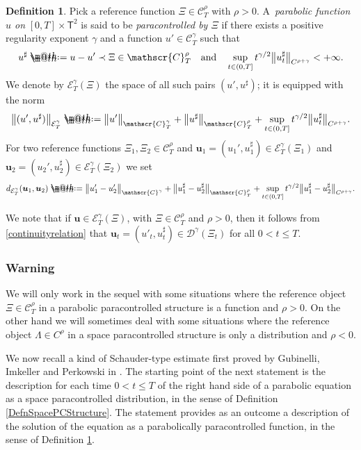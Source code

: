 \documentclass[JEP,XML,SOM,Unicode,published]{cedram}
\makeatletter
\theoremstyle{definition}
\newtheorem{defn}[thm]{Definition}
\newcommand{\bsfT}{\mathbf{\mathsf{T}}}
\newcommand{\mcD}{\mathcal{D}}
\newcommand{\mcE}{\mathcal{E}}
\newcommand{\bsu}{\boldsymbol{u}}
\newcommand{\scrC}{\ensuremath{\mathscr{C}}}
\newcommand*{\defeq}{\mathrel{\rlap{%
\raisebox{0.3ex}{$\m@th\cdot$}}%
\raisebox{-0.3ex}{$\m@th\cdot$}}%
=}
\makeatother
\begin{document}
\begin{defn} \label{DefnParabolicPCStructure}
Pick a reference function $\Xi\in\scrC_T^\rho$ with $\rho>0$. A~\emph{parabolic function $u$ on} \emph{$[0,T]\times\bsfT^2$} is said to be \emph{paracontrolled by $\Xi$} if there exists a positive regularity exponent $\gamma$ and a function $u'\in\scrC^\gamma_T$ such that\vspace*{-3pt}
\[
u^\sharp \defeq u-u'\prec \Xi \in \scrC_T^\rho
\quad
\text{and}
\quad
\sup_{t\in(0,T]}t^{\gamma/2}\big\Vert u^\sharp_t\big\Vert_{C^{\rho+\gamma}} < +\infty.
\]
We denote by $\mcE_T^{\gamma}(\Xi)$ the space of all such pairs $(u',u^\sharp)$; it is equipped with the norm\vspace*{-3pt}
\[
\big\Vert(u',u^\sharp)\big\Vert_{\mcE^{\gamma}_T} \defeq \big\Vert u'\big\Vert_{\scrC_T^\gamma} + \big\Vert u^\sharp\big\Vert_{\scrC_T^\rho} + \sup_{t\in(0,T]}t^{\gamma/2}\big\Vert u^\sharp_t\big\Vert_{C^{\rho+\gamma}}.
\]
For two reference functions $\Xi_1, \Xi_2\in\scrC^\rho_T$ and $\bsu_1=(u_1',u_1^\sharp)\in\mcE^{\gamma}_T(\Xi_1)$ and $\bsu_2 =(u_2',u_2^\sharp)\in\mcE^{\gamma}_T(\Xi_2)$ we set
\[
d_{\mcE^{\gamma}_T}(\bsu_1,\bsu_2) \defeq \big\Vert u_1'-u_2'\big\Vert_{\scrC^\gamma} + \big\Vert u_1^\sharp-u_2^\sharp \big\Vert_{\scrC^\rho_T} + \sup_{t\in(0,T]}t^{\gamma/2}\big\Vert u_1^\sharp-u_2^\sharp\big\Vert_{C^{\rho+\gamma}}.
\]
\end{defn}

We note that if $\bsu\in\mcE^\gamma_T(\Xi)$, with $\Xi\in\scrC^\rho_T$ and $\rho>0$, then it follows from \eqref{continuityrelation} that $\bsu_t=(u'_t,u^\sharp_t) \in \mcD^\gamma(\Xi_t)$ for all $0<t\leq T$.

\subsubsection*{Warning}
We will only work in the sequel with some situations where the reference object $\Xi\in\scrC_T^\rho$ in a parabolic paracontrolled structure is a function and $\rho>0$. On the other hand we will sometimes deal with some situations where the reference object $\Lambda\in C^\rho$ in a space paracontrolled structure is only a distribution and $\rho<0$.

\medskip
We now recall a kind of Schauder-type estimate first proved by Gubinelli, Imkeller and Perkowski in \cite[\S5]{GIP}. The starting point of the next statement is the description for each time $0<t\leq T$ of the right hand side of a parabolic equation as a space paracontrolled distribution, in the sense of Definition \ref{DefnSpacePCStructure}. The statement provides as an outcome a description of the solution of the equation as a parabolically paracontrolled function, in the sense of Definition \ref{DefnParabolicPCStructure}.
\end{document}
